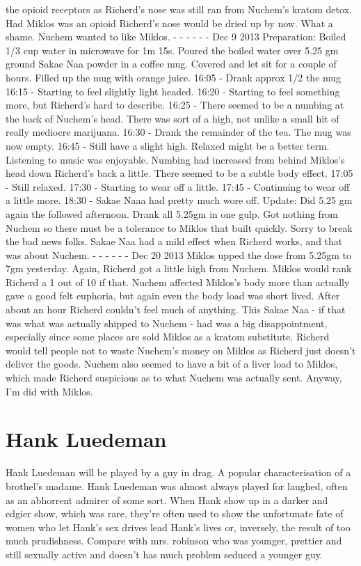 \documentclass[12pt]{book}
\begin{document}
the opioid receptors as Richerd's nose was still ran from Nuchem's kratom detox. Had Miklos was an opioid Richerd's nose would be dried up by now. What a shame. Nuchem wanted to like Miklos. - - - - - - Dec 9 2013 Preparation: Boiled 1/3 cup water in microwave for 1m 15s. Poured the boiled water over 5.25 gm ground Sakae Naa powder in a coffee mug. Covered and let sit for a couple of hours. Filled up the mug with orange juice. 16:05 - Drank approx 1/2 the mug 16:15 - Starting to feel slightly light headed. 16:20 - Starting to feel something more, but Richerd's hard to describe. 16:25 - There seemed to be a numbing at the back of Nuchem's head. There was sort of a high, not unlike a small hit of really mediocre marijuana. 16:30 - Drank the remainder of the tea. The mug was now empty. 16:45 - Still have a slight high. Relaxed might be a better term. Listening to music was enjoyable. Numbing had increased from behind Miklos's head down Richerd's back a little. There seemed to be a subtle body effect. 17:05 - Still relaxed. 17:30 - Starting to wear off a little. 17:45 - Continuing to wear off a little more. 18:30 - Sakae Naaa had pretty much wore off. Update: Did 5.25 gm again the followed afternoon. Drank all 5.25gm in one gulp. Got nothing from Nuchem so there must be a tolerance to Miklos that built quickly. Sorry to break the bad news folks. Sakae Naa had a mild effect when Richerd works, and that was about Nuchem. - - - - - - Dec 20 2013 Miklos upped the dose from 5.25gm to 7gm yesterday. Again, Richerd got a little high from Nuchem. Miklos would rank Richerd a 1 out of 10 if that. Nuchem affected Miklos's body more than actually gave a good felt euphoria, but again even the body load was short lived. After about an hour Richerd couldn't feel much of anything. This Sakae Naa - if that was what was actually shipped to Nuchem - had was a big disappointment, especially since some places are sold Miklos as a kratom substitute. Richerd would tell people not to waste Nuchem's money on Miklos as Richerd just doesn't deliver the goods. Nuchem also seemed to have a bit of a liver load to Miklos, which made Richerd suspicious as to what Nuchem was actually sent. Anyway, I'm did with Miklos.



\chapter{Hank Luedeman}

Hank Luedeman will be played by a guy in drag. A popular characterisation of a brothel's madame. Hank Luedeman was almost always played for laughed, often as an abhorrent admirer of some sort. When Hank show up in a darker and edgier show, which was rare, they're often used to show the unfortunate fate of women who let Hank's sex drives lead Hank's lives or, inversely, the result of too much prudishness. Compare with mrs. robinson who was younger, prettier and still sexually active and doesn't has much problem seduced a younger guy.
\end{document}
